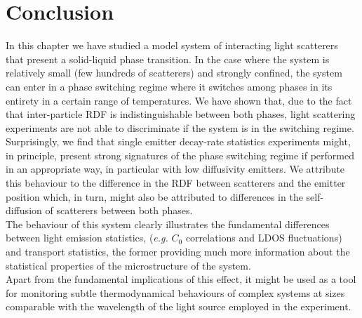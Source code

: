 \section{Conclusion\label{sec:chap8_conclusion}}

In this chapter we have studied a model system of interacting light scatterers that present a solid-liquid phase transition. In the case where the system is relatively small (few hundreds of scatterers) and strongly confined, the system can enter in a phase switching regime where it switches among phases in its entirety in a certain range of temperatures. We have shown that, due to the fact that inter-particle RDF is indistinguishable between both phases, light scattering experiments are not able to discriminate if the system is in the switching regime. \\
Surprisingly, we find that single emitter decay-rate statistics experiments might, in principle, present strong signatures of the phase switching regime if performed in an appropriate way, in particular with low diffusivity emitters. We attribute this behaviour to the difference in the RDF between scatterers and the emitter position which, in turn, might also be attributed to differences in the self-diffusion of scatterers between both phases.\\
The behaviour of this system clearly illustrates the fundamental differences between light emission statistics, (\textit{e.g.} $C_{0}$ correlations and LDOS fluctuations) and transport statistics, the former providing much more information about the statistical properties of the microstructure of the system.\\
Apart from the fundamental implications of this effect, it might be used as a tool for monitoring subtle thermodynamical behaviours of complex systems at sizes comparable with the wavelength of the light source employed in the experiment.\\
















